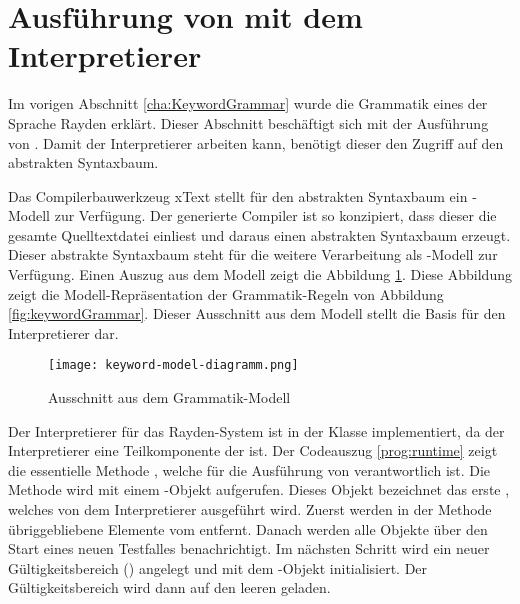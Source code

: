 
\section{Ausführung von  mit dem Interpretierer}
\label{cha:StackMachine}

Im vorigen Abschnitt \ref{cha:KeywordGrammar} wurde die Grammatik eines  der Sprache Rayden erklärt. Dieser Abschnitt beschäftigt sich mit der Ausführung von . Damit der Interpretierer arbeiten kann, benötigt dieser den Zugriff auf den abstrakten Syntaxbaum. 

\SuperPar
Das Compilerbauwerkzeug xText stellt für den abstrakten Syntaxbaum ein -Modell zur Verfügung. Der generierte Compiler ist so konzipiert, dass dieser die gesamte Quelltextdatei einliest und daraus einen abstrakten Syntaxbaum erzeugt. Dieser abstrakte Syntaxbaum steht für die weitere Verarbeitung als -Modell zur Verfügung. Einen Auszug aus dem Modell zeigt die Abbildung \ref{fig:AST}. Diese Abbildung zeigt die Modell-Repräsentation der Grammatik-Regeln von Abbildung \ref{fig:keywordGrammar}. Dieser Ausschnitt aus dem Modell stellt die Basis für den Interpretierer dar. 

\begin{figure}[h]
\centering
\texttt{[image: keyword-model-diagramm.png]}
\caption{Ausschnitt aus dem Grammatik-Modell}
\label{fig:AST}
\end{figure}

\SuperPar
Der Interpretierer für das Rayden-System ist in der Klasse  implementiert, da der Interpretierer eine Teilkomponente der  ist. Der Codeauszug \ref{prog:runtime} zeigt die essentielle Methode , welche für die Ausführung von  verantwortlich ist. Die Methode wird mit einem -Objekt aufgerufen. Dieses Objekt bezeichnet das erste , welches von dem Interpretierer ausgeführt wird. Zuerst werden in der Methode übriggebliebene Elemente vom  entfernt. Danach werden alle Objekte über den Start eines neuen Testfalles benachrichtigt. Im nächsten Schritt wird ein neuer Gültigkeitsbereich () angelegt und mit dem -Objekt initialisiert. Der Gültigkeitsbereich wird dann auf den leeren  geladen. 

